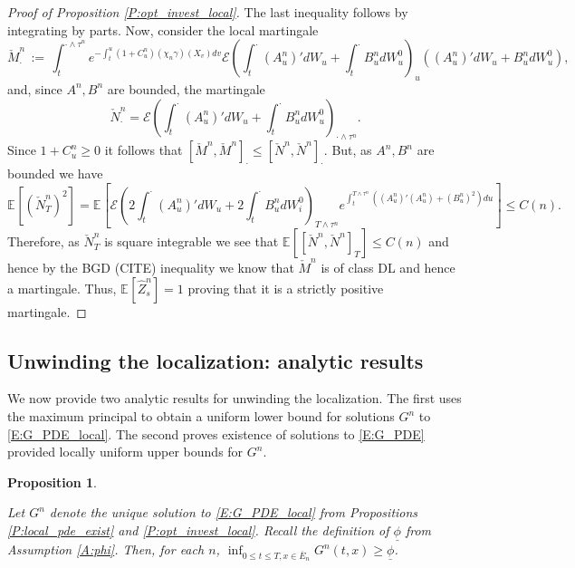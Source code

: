 \documentclass[11pt, letterpaper]{amsart}
\newtheorem{proposition}[theorem]{Proposition}
\theoremstyle{definition}
\theoremstyle{remark}
\numberwithin{equation}{section}
\newcommand{\hz}{\hat{Z}}
\newcommand{\esp}{\mathbb{E}}
\newcommand{\espalt}[2]{\esp^{#1}\bra{#2}}
\newcommand{\EN}{\mathcal{E}}
\newcommand{\dfn}{\, := \,}
\newcommand{\bra}[1]{\left[#1\right]}
\newcommand{\ul}[1]{\underline{#1}}
\newcommand{\ol}[1]{\overline{#1}}
\begin{document}
\begin{proof}[Proof of Proposition \ref{P:opt_invest_local}]
{The last inequality follows by integrating by parts.  Now, consider the local martingale
\begin{equation*}
\check{M}^n_\cdot \dfn \int_t^{\cdot\wedge\tau^n}e^{-\int_t^u (1+C^n_u)(\chi_n\gamma)(X_v)dv}\EN\left(\int_t^\cdot (A^n_u)'dW_u + \int_t^\cdot B^n_u dW^0_u\right)_{u}\left((A^n_u)'dW_u + B^n_u dW^0_u\right),
\end{equation*}
and, since $A^n,B^n$ are bounded, the martingale
\begin{equation*}
\check{N}^n_\cdot = \EN\left(\int_t^\cdot (A^n_u)'dW_u + \int_t^\cdot B^n_u dW^0_u\right)_{\cdot\wedge\tau^n}.
\end{equation*}
Since $1+C^n_u\geq 0$ it follows that $[\check{M}^n,\check{M}^n]_\cdot \leq [\check{N}^n,\check{N}^n]_\cdot$. But, as $A^n,B^n$ are bounded we have
\begin{equation*}
\espalt{}{(\check{N}^n_T)^2} = \espalt{}{\EN\left(2\int_t^\cdot (A^n_u)'dW_u + 2\int_t^\cdot B^n_udW^0_i\right)_{T\wedge\tau^n} e^{\int_t^{T\wedge\tau^n}\left((A^n_u)'(A^n_u) + (B^n_u)^2\right)du}} \leq C(n).
\end{equation*}
Therefore, as $\check{N}^n_T$ is square integrable we see that $\espalt{}{[\check{N}^n,\check{N}^n]_T} \leq C(n)$ and hence by the BGD (CITE) inequality we know that $\check{M}^n$ is of class DL and hence a martingale.  Thus,  $\espalt{}{\hz^n_s} = 1$ proving that it is a strictly positive martingale.

}




\end{proof}

\subsection{Unwinding the localization: analytic results}\label{SS:unwind_anal}

We now provide two analytic results for unwinding the localization.  The first uses the maximum principal to obtain a uniform lower bound for solutions $G^n$ to \eqref{E:G_PDE_local}.  The second proves existence of solutions to \eqref{E:G_PDE} provided locally uniform upper bounds for $G^n$.

\begin{proposition}\label{P:G_n_global_min}

Let $G^n$ denote the unique solution to \eqref{E:G_PDE_local} from Propositions \ref{P:local_pde_exist} and \ref{P:opt_invest_local}.  Recall the definition of $\ul{\phi}$ from Assumption \ref{A:phi}.  Then, for each $n$, $\inf_{0\leq t\leq T, x\in\ol{E}_n} G^n(t,x) \geq \ul{\phi}$.
\end{proposition}
\end{document}
